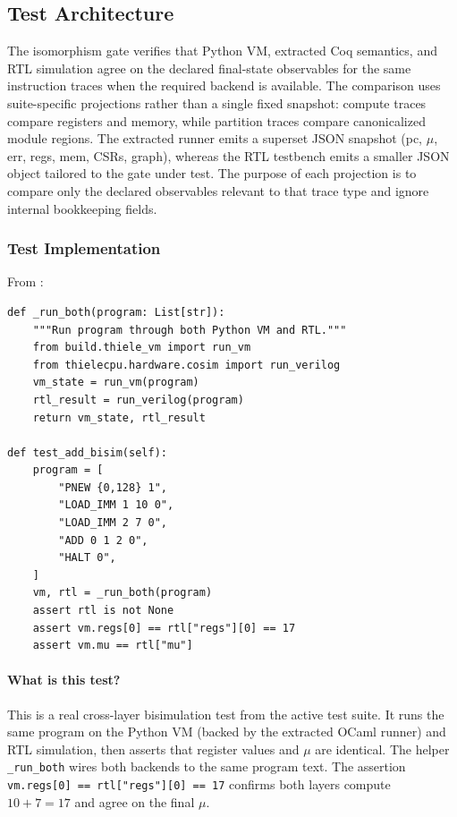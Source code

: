 \subsection{Test Architecture}

The isomorphism gate verifies that Python VM, extracted Coq semantics, and RTL simulation agree on the declared final-state observables for the same instruction traces when the required backend is available. The comparison uses suite-specific projections rather than a single fixed snapshot: compute traces compare registers and memory, while partition traces compare canonicalized module regions. The extracted runner emits a superset JSON snapshot (pc, $\mu$, err, regs, mem, CSRs, graph), whereas the RTL testbench emits a smaller JSON object tailored to the gate under test. The purpose of each projection is to compare only the declared observables relevant to that trace type and ignore internal bookkeeping fields.

\subsubsection{Test Implementation}

From :
\begin{lstlisting}
def _run_both(program: List[str]):
    """Run program through both Python VM and RTL."""
    from build.thiele_vm import run_vm
    from thielecpu.hardware.cosim import run_verilog
    vm_state = run_vm(program)
    rtl_result = run_verilog(program)
    return vm_state, rtl_result

def test_add_bisim(self):
    program = [
        "PNEW {0,128} 1",
        "LOAD_IMM 1 10 0",
        "LOAD_IMM 2 7 0",
        "ADD 0 1 2 0",
        "HALT 0",
    ]
    vm, rtl = _run_both(program)
    assert rtl is not None
    assert vm.regs[0] == rtl["regs"][0] == 17
    assert vm.mu == rtl["mu"]
\end{lstlisting}

\paragraph{What is this test?} This is a real cross-layer bisimulation test from the active test suite. It runs the same program on the Python VM (backed by the extracted OCaml runner) and RTL simulation, then asserts that register values and $\mu$ are identical. The helper \texttt{\_run\_both} wires both backends to the same program text. The assertion \texttt{vm.regs[0] == rtl["regs"][0] == 17} confirms both layers compute $10+7=17$ and agree on the final $\mu$.


